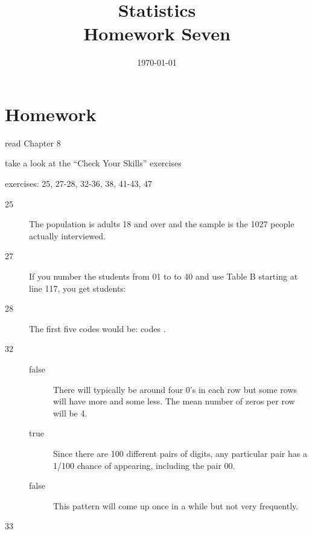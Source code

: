\documentclass[letterpaper, landscape]{exam}
\title{Statistics \\ Homework Seven}
\date{\today}
\author{}
\begin{document}
  \maketitle

  \section{Homework}
    \begin{itemize*}
      \item read Chapter 8 
      \item take a look at the ``Check Your Skills'' exercises
      \item exercises: 25, 27-28, 32-36, 38, 41-43, 47
    \end{itemize*}

  \ifprintanswers
    \begin{description}

      \item[25] The population is adults 18 and over and the sample is the 1027
        people actually interviewed.

      \item[27] If you number the students from 01 to to 40 and use Table B
        starting at line 117, you get students: 


      \item[28] The first five codes would be: codes 
        .

      \item[32] 
        \begin{description}
          \item[false] There will typically be around four 0's in each row but some
            rows will have more and some less.  The mean number of zeros per row
            will be 4.

          \item[true] Since there are 100 different pairs of digits, any particular
          pair has a 1/100 chance of appearing, including the pair 00.

          \item[false] This pattern will come up once in a while but not very
            frequently.
        \end{description}

      \item[33]
        \begin{parts}

\end{parts}
\end{description}
\end{document}
